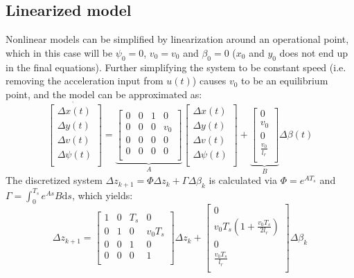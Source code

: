 \documentclass{article}
\begin{document}
\subsection{Linearized model}
Nonlinear models can be simplified by linearization around an operational point, which in this case will be $\psi_0=0$, $v_0=v_0$ and $\beta_0=0$ ($x_0$ and $y_0$ does not end up in the final equations). Further simplifying the system to be constant speed (i.e. removing the acceleration input from $u(t)$) causes $v_0$ to be an equilibrium point, and the model can be approximated as:
\begin{equation}
  \dot{\begin{bmatrix}
    \Delta x(t) \\
    \Delta y(t) \\
    \Delta v(t) \\
    \Delta \psi(t) \\
  \end{bmatrix}} = \underbrace{\begin{bmatrix}
    0 & 0 & 1 & 0 \\
    0 & 0 & 0 & v_0 \\
    0 & 0 & 0 & 0 \\
    0 & 0 & 0 & 0 \\
  \end{bmatrix}}_{A}\begin{bmatrix}
    \Delta x(t) \\
    \Delta y(t) \\
    \Delta v(t) \\
    \Delta \psi(t) \\
  \end{bmatrix} + \underbrace{\begin{bmatrix}
    0 \\
    v_0 \\
    0 \\
    \frac{v_0}{l_r} \\
  \end{bmatrix}}_{B}\Delta\beta(t)
\end{equation}
The discretized system $\Delta z_{k+1}=\Phi\Delta z_k + \Gamma\Delta\beta_k$ is calculated via $\Phi=e^{AT_s}$ and $\Gamma=\int_0^{T_s}e^{As}B\mathrm{d}s$, which yields:
\begin{equation}
  \Delta z_{k+1} = \begin{bmatrix}
    1 & 0 & T_s & 0 \\
    0 & 1 & 0 & v_0T_s \\
    0 & 0 & 1 & 0 \\
    0 & 0 & 0 & 1 \\
  \end{bmatrix}\Delta z_k + \begin{bmatrix}
    0 \\
    v_0T_s\left(1 + \frac{v_0T_s}{2l_r}\right) \\
    0 \\
    \frac{v_0T_s}{l_r} \\
  \end{bmatrix} \Delta\beta_k
\end{equation}
\end{document}
